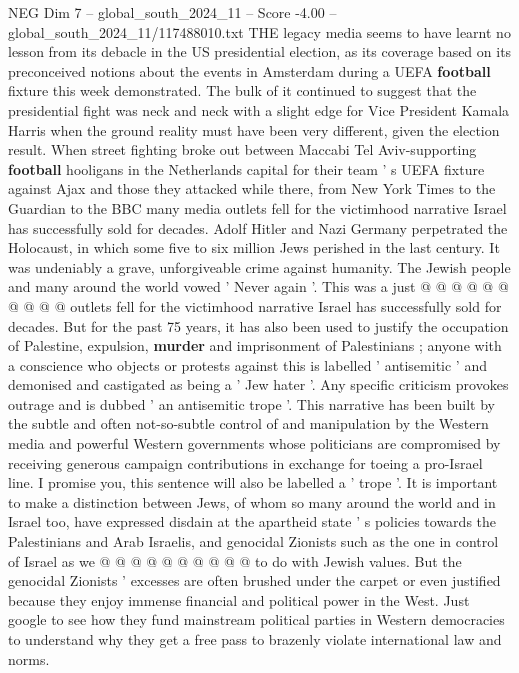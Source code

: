 \begin{textsample}{NEG Dim 7 – global\_south\_2024\_11 – Score -4.00 – global\_south\_2024\_11/117488010.txt}  \label{ex:f7_neg_440}
THE legacy media seems to have learnt no lesson from its debacle in the US presidential election, as its coverage based on its preconceived notions about the events in Amsterdam during a UEFA \textbf{football} fixture this week demonstrated.
The bulk of it continued to suggest that the presidential fight was neck and neck with a slight edge for Vice President Kamala Harris when the ground reality must have been very different, given the election result.
When street fighting broke out between Maccabi Tel Aviv-supporting \textbf{football} hooligans in the Netherlands capital for their team ' s UEFA fixture against Ajax and those they attacked while there, from New York Times to the Guardian to the BBC many media outlets fell for the victimhood narrative Israel has successfully sold for decades.
Adolf Hitler and Nazi Germany perpetrated the Holocaust, in which some five to six million Jews perished in the last century.
It was undeniably a grave, unforgiveable crime against humanity.
The Jewish people and many around the world vowed ' Never again '.
This was a just @ @ @ @ @ @ @ @ @ @ outlets fell for the victimhood narrative Israel has successfully sold for decades.
But for the past 75 years, it has also been used to justify the occupation of Palestine, expulsion, \textbf{murder} and imprisonment of Palestinians ; anyone with a conscience who objects or protests against this is labelled ' antisemitic ' and demonised and castigated as being a ' Jew hater '.
Any specific criticism provokes outrage and is dubbed ' an antisemitic trope '.
This narrative has been built by the subtle and often not-so-subtle control of and manipulation by the Western media and powerful Western governments whose politicians are compromised by receiving generous campaign contributions in exchange for toeing a pro-Israel line.
I promise you, this sentence will also be labelled a ' trope '.
It is important to make a distinction between Jews, of whom so many around the world and in Israel too, have expressed disdain at the apartheid state ' s policies towards the Palestinians and Arab Israelis, and genocidal Zionists such as the one in control of Israel as we @ @ @ @ @ @ @ @ @ @ to do with Jewish values.
But the genocidal Zionists ' excesses are often brushed under the carpet or even justified because they enjoy immense financial and political power in the West.
Just google to see how they fund mainstream political parties in Western democracies to understand why they get a free pass to brazenly violate international law and norms.

\end{textsample}
